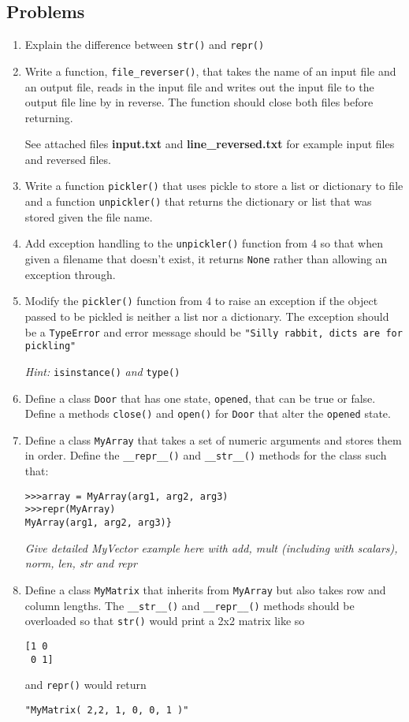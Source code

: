 \documentclass{report}
\begin{document}
\subsection{Problems}
\begin{enumerate}
	\item Explain the difference between \verb|str()| and \verb|repr()|
	\item Write a function, \verb|file_reverser()|, that takes the name of an input file and an output file, reads in the input file and writes out the input file to the output file line by in reverse. The function should close both files before returning.

See attached files \textbf{input.txt} and \textbf{line\_reversed.txt} for example input files and reversed files.
	\item Write a function \verb|pickler()| that uses pickle to store a list or dictionary to file and a function \verb|unpickler()| that returns the dictionary or list that was stored given the file name.
	\item Add exception handling to the \verb|unpickler()| function from 4 so that when given a filename that doesn't exist, it returns \verb|None| rather than allowing an exception through.
	\item Modify the \verb|pickler()| function from 4 to raise an exception if the object passed to be pickled is neither a list nor a dictionary. The exception should be a \verb|TypeError| and error message should be \verb|"Silly rabbit, dicts are for pickling"|

\emph{Hint: }\verb|isinstance()| \emph{and} \verb|type()|

	\item Define a class \verb|Door| that has one state, \verb|opened|, that can be true or false. Define a methods \verb|close()| and \verb|open()| for \verb|Door| that alter the \verb|opened| state. 
	\item Define a class \verb|MyArray| that takes a set of numeric arguments and stores them in order. Define the \verb|__repr__()| and \verb|__str__()| methods for the class such that:

\begin{verbatim}
>>>array = MyArray(arg1, arg2, arg3)
>>>repr(MyArray)
MyArray(arg1, arg2, arg3)}
\end{verbatim}


\emph{Give detailed MyVector example here with add, mult (including with scalars), norm, len, str and repr}

	\item Define a class \verb|MyMatrix| that inherits from \verb|MyArray| but also takes row and column lengths. The \verb|__str__()| and \verb|__repr__()| methods should be overloaded so that \verb|str()| would print a 2x2 matrix like so

\begin{verbatim}
[1 0
 0 1]
\end{verbatim}

and \verb|repr()| would return

\verb|"MyMatrix( 2,2, 1, 0, 0, 1 )"|

\end{enumerate}
\end{document}
